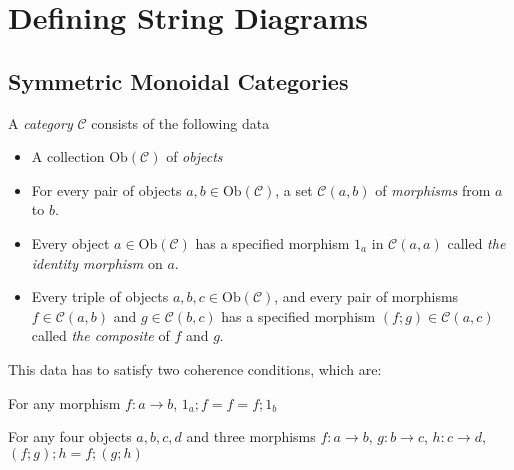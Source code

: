 \section{Defining String Diagrams}

\subsection{Symmetric Monoidal Categories}

\begin{defn}[Category]
A \emph{category} $\mathcal{C}$ consists of the following data
\begin{itemize}
\item{A collection $\text{Ob}(\mathcal{C})$ of \emph{objects}}
\item{For every pair of objects $a,b \in \text{Ob}(\mathcal{C})$, a set $\mathcal{C}(a,b)$ of \emph{morphisms} from $a$ to $b$.}
\item{Every object $a \in \text{Ob}(\mathcal{C})$ has a specified morphism $1_a$ in $\mathcal{C}(a,a)$ called \emph{the identity morphism} on $a$.}
\item{Every triple of objects $a,b,c \in \text{Ob}(\mathcal{C})$, and every pair of morphisms $f \in \mathcal{C}(a,b)$ and $g \in \mathcal{C}(b,c)$ has a specified morphism $(f;g) \in \mathcal{C}(a,c)$ called \emph{the composite} of $f$ and $g$.}
\end{itemize}
This data has to satisfy two coherence conditions, which are:

 For any morphism $f: a \rightarrow b$, $1_a;f = f = f;1_b$

 For any four objects $a,b,c,d$ and three morphisms $f: a \rightarrow b$, $g: b \rightarrow c$, $h: c \rightarrow d$, $(f;g);h = f;(g;h)$
\end{defn}

\begin{defn}

\end{defn}

\begin{example}

\end{example}

\begin{defn}[Functor]

\end{defn}

\begin{defn}

\end{defn}


